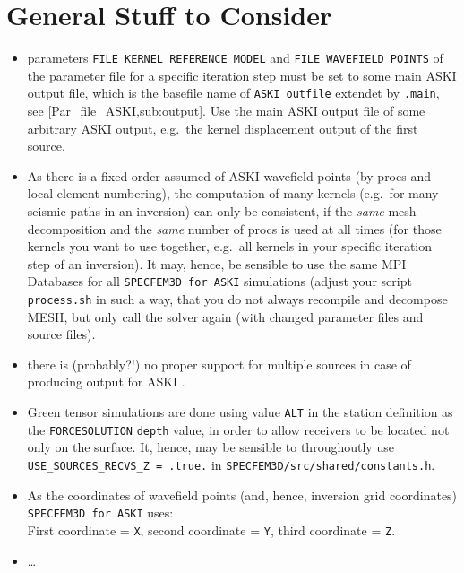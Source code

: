 \documentclass[12pt,a4paper]{article}
\newcommand{\lcode}[1]{\nolinkurl{#1}}
\newcommand{\ASKI}{ {\ttfamily ASKI} }
\begin{document}
\section{General Stuff to Consider} \label{general_stuff}
%
\begin{itemize}
\item parameters \lcode{FILE_KERNEL_REFERENCE_MODEL} and \lcode{FILE_WAVEFIELD_POINTS} 
  of the parameter file for a specific iteration step must be set to some main \ASKI output file,
  which is the basefile name of \lcode{ASKI_outfile} extendet by \lcode{.main}, see \ref{Par_file_ASKI,sub:output}.
  Use the main \ASKI output file of some arbitrary \ASKI output, e.g.\ the kernel displacement output of the first source.
\item As there is a fixed order assumed of \ASKI wavefield points (by procs and local element numbering), the 
  computation of many kernels (e.g.\ for many seismic paths in an inversion) can only be consistent, if the 
  \emph{same} mesh decomposition and the \emph{same} number of procs is used at all times 
  (for those kernels you want to use together, e.g.\ all kernels in your specific iteration step of an inversion).
  It may, hence, be sensible to use the same MPI Databases for all \lcode{SPECFEM3D for ASKI} simulations (adjust your 
  script \lcode{process.sh} in such a way, that you do not always recompile and decompose MESH, but only call the solver
  again (with changed parameter files and source files).
\item there is (probably?!) no proper support for multiple sources in case of producing output for \ASKI.
\item Green tensor simulations are done using  value \lcode{ALT} in the station definition as the 
  \lcode{FORCESOLUTION} \lcode{depth} value, in order to allow receivers to be located not only on the surface.
  It, hence, may be sensible to throughoutly use \lcode{USE_SOURCES_RECVS_Z = .true.} in \lcode{SPECFEM3D/src/shared/constants.h}.
\item As the coordinates of wavefield points (and, hence, inversion grid coordinates) \lcode{SPECFEM3D for ASKI} uses:\\
  First coordinate = \lcode{X}, second coordinate = \lcode{Y}, third coordinate = \lcode{Z}.
\item \dots
\end{itemize}
%
\end{document}
